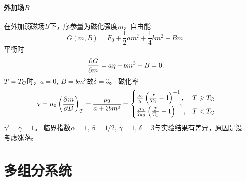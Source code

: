\paragraph{外加场$B$}
在外加弱磁场$B$下，序参量为磁化强度$m$，自由能
\[
	G(m,B)=F_0+\frac12am^2+\frac14bm^2-Bm.
\]
平衡时
\[
	\frac{\partial^{{}}G}{\partial{m}^{{}}}=a\eta+bm^3-B=0.
\]
$T=T_\mathrm C$时，$a=0,\;B=bm^3$故$\delta=3$。
磁化率
\[
	\chi=\mu_0\left(\frac{\partial^{{}}m}{\partial{B}^{{}}}\right)_T=\frac{\mu_0}{a+3bm^3}=
	\begin{cases}
		\frac{\mu_0}{a_0}\left(\frac T{T_\mathrm C}-1\right)^{-1},&T\geqslant T_\mathrm C \\
		\frac{\mu_0}{2a_0}\left(\frac T{T_\mathrm C}-1\right)^{-1}, & T<T_\mathrm C
	\end{cases}
\]
$\gamma'=\gamma=1$。
临界指数$\alpha=1,\,\beta=1/2,\,\gamma=1,\,\delta=3$与实验结果有差异，原因是没考虑涨落。



\section{多组分系统}


